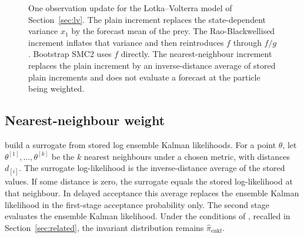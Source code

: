 \begin{figure}[t]
\centering
{}
\caption{One observation update for the Lotka--Volterra model of Section~\ref{sec:lv}. The plain increment replaces the state-dependent variance \(x_1\) by the forecast mean of the prey. The Rao-Blackwellised increment inflates that variance and then reintroduces \(f\) through \(f/g\). Bootstrap SMC2 uses \(f\) directly. The nearest-neighbour increment replaces the plain increment by an inverse-distance average of stored plain increments and does not evaluate a forecast at the particle being weighted.}
\label{fig:increment}
\end{figure}

\subsection{Nearest-neighbour weight}
\label{sec:knn}

\citet[Section~4.2]{golightly2026} build a surrogate from stored log ensemble Kalman likelihoods. For a point \(\theta\), let \(\theta^{[1]}, \ldots, \theta^{[k]}\) be the \(k\) nearest neighbours under a chosen metric, with distances \(d_{[i]}\). The surrogate log-likelihood is the inverse-distance average of the stored values. If some distance is zero, the surrogate equals the stored log-likelihood at that neighbour. In delayed acceptance this average replaces the ensemble Kalman likelihood in the first-stage acceptance probability only. The second stage evaluates the ensemble Kalman likelihood. Under the conditions of \citet[Theorem~1]{christen2005}, recalled in Section~\ref{sec:related}, the invariant distribution remains \(\hat{\pi}_{\mathrm{enkf}}\).

